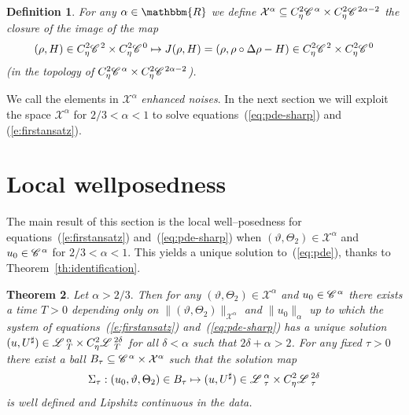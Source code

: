 \documentclass[11pt,reqno]{amsart}
\newcommand{\tmtextit}[1]{{\itshape{#1}}}
\newtheorem{theorem}{Theorem}
\newtheorem{definition}[theorem]{Definition}
\newcommand{\CC}{\mathscr{C} \hspace{.1em}}
\newcommand{\LL}{\mathscr{L} \hspace{.2em}}
\begin{document}
\begin{definition}
  For any $\alpha \in \mathbbm{R}$ we define $\mathcal{X}^{\alpha} \subseteq
  C^2_{\eta} \CC^{\alpha} \times C^2_{\eta} \CC^{2 \alpha - 2}$ the closure of
  the image of the map
  \[ (\rho, H) \in C^2_{\eta} \CC^2 \times C^2_{\eta} \CC^0 \mapsto J (\rho,
     H) = (\rho, \rho \circ \Delta \rho - H) \in C^2_{\eta} \CC^2 \times
     C^2_{\eta} \CC^0 \]
  (in the topology of $C^2_{\eta} \CC^{\alpha} \times C^2_{\eta} \CC^{2 \alpha
  - 2}$).
\end{definition}

We call the elements in $\mathcal{X}^{\alpha}$ \tmtextit{enhanced noises}. In
the next section we will exploit the space $\mathcal{X}^{\alpha}$ for $2 / 3 <
\alpha < 1$ to solve equations~(\ref{eq:pde-sharp}) and (\ref{e:firstansatz}).
\

\section{Local wellposedness\label{s:fixpoint}}

The main result of this section is the local well--posedness for
equations~(\ref{e:firstansatz}) and~(\ref{eq:pde-sharp}) when $(\vartheta,
\Theta_2) \in \mathcal{X}^{\alpha}$ and $u_0 \in \CC^{\alpha}$ for $2 / 3 <
\alpha < 1$. This yields a unique solution to~(\ref{eq:pde}), thanks to
Theorem~\ref{th:identification}.

\begin{theorem}
  Let $\alpha > 2 / 3.$ Then for any $(\vartheta, \Theta_2) \in
  \mathcal{X}^{\alpha}$ and $u_0 \in \CC^{\alpha}$ there exists a time $T > 0$
  depending only on $\| (\vartheta, \Theta_2) \|_{\mathcal{X}^{\alpha}}$ and
  $\| u_0 \|_{\alpha}$ up to which the system of
  equations~(\ref{e:firstansatz}) and~(\ref{eq:pde-sharp}) has a unique
  solution $(u, U^{\sharp}) \in \LL^{\alpha}_T \times C_{\eta}^2 \LL^{2
  \delta}_T$ for all $\delta < \alpha$ such that $2 \delta + \alpha > 2$. For
  any fixed $\tau > 0$ there exist a ball $B_{\tau} \subseteq \CC^{\alpha}
  \times \mathcal{X}^{\alpha}$ such that the solution map
  \[ \Sigma_{\tau} : (u_0, \vartheta, \Theta_2) \in B_{\tau} \mapsto (u,
     U^{\sharp}) \in \LL^{\alpha}_{\tau} \times C_{\eta}^2 \LL^{2
     \delta}_{\tau} \]
  is well defined and Lipshitz continuous in the data. 
\end{theorem}
\end{document}
